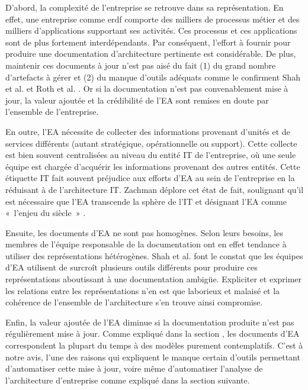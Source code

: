 	D'abord, la complexité de l'entreprise se retrouve dans sa représentation. En effet, une entreprise comme \gls{erdf} comporte des milliers de processus métier et des milliers d'applications supportant ses activités. Ces processus et ces applications sont de plus fortement interdépendants. Par conséquent, l'effort à fournir pour produire une documentation d'architecture pertinente est considérable. De plus, maintenir ces documents à jour n'est pas aisé du fait (1) du grand nombre d'artefacts à gérer et (2) du manque d'outils adéquats comme le confirment Shah et al. \cite{shah2007frameworks} et Roth et al. \cite{roth2013enterprise}. Or si la documentation n'est pas convenablement mise à jour, la valeur ajoutée et la crédibilité de l'EA sont remises en doute par l'ensemble de l'entreprise. 
	
	En outre, l'EA nécessite de collecter des informations provenant d'unités et de services différents (autant stratégique, opérationnelle ou support). Cette collecte est bien souvent centralisées au niveau du entité IT de l'entreprise, où une seule équipe est chargée d'acquérir les informations provenant des autres entités. Cette étiquette IT fait souvent préjudice aux efforts d'EA au sein de l'entreprise en la réduisant à de l'architecture IT. Zachman déplore cet état de fait, soulignant qu'il est nécessaire que l'EA transcende la sphère de l'IT et désignant l'EA comme «~l'enjeu du siècle~» \cite{zachman1997enterprise}.
	
	Ensuite, les documents d'EA ne sont pas homogènes. Selon leurs besoins, les membres de l'équipe responsable de la documentation ont en effet tendance à utiliser des représentations hétérogènes. Shah et al. \cite{shah2007frameworks} font le constat que les équipes d'EA utilisent de surcroît plusieurs outils différents pour produire ces représentations aboutissant à une documentation ambigüe. Expliciter et exprimer les relations entre les représentations n'en est que laborieux et malaisé et la cohérence de l'ensemble de l'architecture s'en trouve ainsi compromise.
	
	Enfin, la valeur ajoutée de l'EA diminue si la documentation produite n'est pas régulièrement mise à jour. Comme expliqué dans la section , les documents d'EA correspondent la plupart du temps à des modèles purement contemplatifs. C'est à notre avis, l'une des raisons qui expliquent le manque certain d'outils permettant d'automatiser cette mise à jour, voire même d'automatiser l'analyse de l'architecture d'entreprise comme expliqué dans la section suivante.
	

